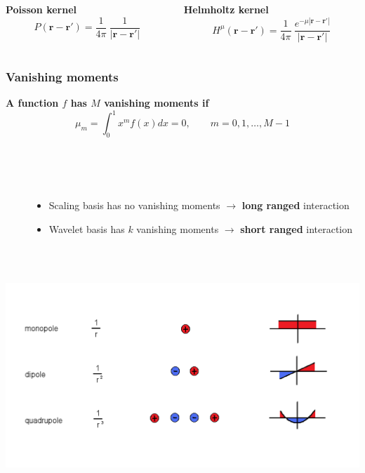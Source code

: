 \documentclass[mathserif, 8pt]{beamer}
\begin{document}
\begin{frame}
\begin{columns}
    \begin{column}{.48\textwidth}
    \centering
    \textbf{Poisson kernel}
    \begin{equation}
	\nonumber
	P(\boldsymbol{r}-\boldsymbol{r}') = 
	    \frac{1}{4\pi}\ \frac{1}{|\boldsymbol{r}-\boldsymbol{r}'|}
    \end{equation}
    \end{column}
    \begin{column}{.48\textwidth}
    \centering
    \textbf{Helmholtz kernel}
    \begin{equation}
	\nonumber
	H^{\mu}(\boldsymbol{r}-\boldsymbol{r}') = \frac{1}{4\pi}\ 
	    \frac{e^{-\mu |\boldsymbol{r}-\boldsymbol{r}'|}}{|\boldsymbol{r}-\boldsymbol{r}'|}
    \end{equation}
    \end{column}
    \end{columns}    
\end{frame}

\begin{frame}
    \frametitle{Vanishing moments}
    \centering
    \textbf{A function $f$ has $M$ vanishing moments if}
    \begin{equation}
	\nonumber
	\mu_m = \int_0^1 x^m f(x) dx = 0,\qquad m = 0, 1, \dots, M - 1
    \end{equation}
    \ \\
    \ \\
    \ \\
    \begin{columns}
    \begin{column}{.15\textwidth}
	\ \\
    \end{column}
    \begin{column}{.85\textwidth}
    \begin{itemize}
        \item   Scaling basis has no vanishing moments $\longrightarrow$ \textbf{long ranged} interaction
        \item   Wavelet basis has $k$ vanishing moments $\longrightarrow$ \textbf{short ranged} interaction
    \end{itemize}
    \end{column}
    \end{columns}
    \ \\
    \ \\
    \includegraphics[scale=0.3, clip, viewport = 0 50 680 350]{figures/multipoles.pdf}
\end{frame}
\end{document}
